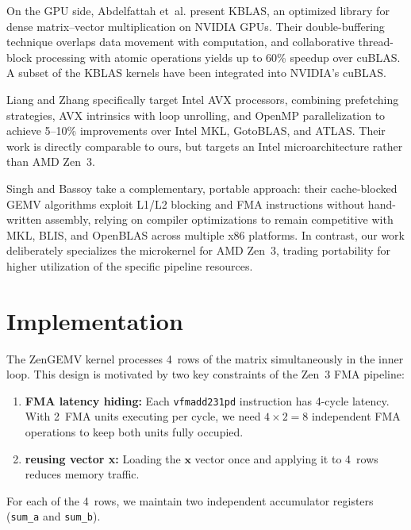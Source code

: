 \documentclass[runningheads]{llncs}
\begin{document}
On the GPU side, Abdelfattah et~al.\cite{kblas} present KBLAS, an optimized
library for dense matrix--vector multiplication on NVIDIA GPUs. Their
double-buffering technique overlaps data movement with computation, and
collaborative thread-block processing with atomic operations yields up to 60\%
speedup over cuBLAS. A subset of the KBLAS kernels have been integrated into
NVIDIA's cuBLAS. 

Liang and Zhang\cite{liang2016gemv} specifically target Intel
AVX processors, combining prefetching strategies, AVX intrinsics with loop
unrolling, and OpenMP parallelization to achieve 5--10\% improvements over Intel
MKL, GotoBLAS, and ATLAS. Their work is directly comparable to ours, but targets
an Intel microarchitecture rather than AMD Zen~3. 

Singh and Bassoy\cite{singh2021gemv} take a complementary, portable approach: their
cache-blocked GEMV algorithms exploit L1/L2 blocking and FMA instructions
without hand-written assembly, relying on compiler optimizations to remain
competitive with MKL, BLIS, and OpenBLAS across multiple x86 platforms. In
contrast, our work deliberately specializes the microkernel for AMD Zen~3,
trading portability for higher utilization of the specific pipeline resources.


\section{Implementation}

The ZenGEMV kernel processes 4~rows of the matrix simultaneously in the inner
loop. This design is motivated by two key constraints of the Zen~3 FMA pipeline:

\begin{enumerate}
\item \textbf{FMA latency hiding:} Each \texttt{vfmadd231pd} instruction has
      4-cycle latency\cite{fog2011instruction}. With 2~FMA units executing per cycle, we need
      $4 \times 2 = 8$ independent FMA operations to keep both units fully occupied.
\item \textbf{reusing vector x:} Loading the $\mathbf{x}$ vector once and
      applying it to 4~rows reduces memory traffic.
\end{enumerate}

For each of the 4~rows, we maintain two independent accumulator registers
(\texttt{sum\_a} and \texttt{sum\_b}).
\end{document}
